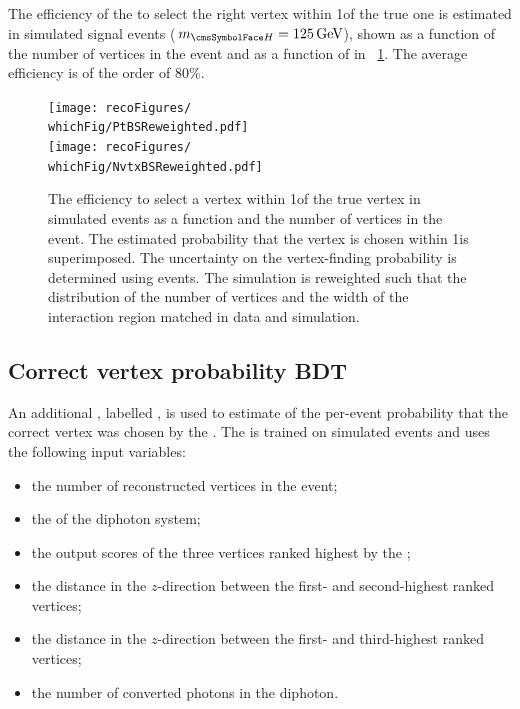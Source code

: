 The efficiency of the \VtxIdBdt to select the right vertex within 1\cm of the true one is estimated in simulated signal events ($\mH=125\GeV$), shown as a function of the number of vertices in the event and as a function of \pT in \Fig~\ref{fig:reco:vtxidbdt_eff}. The average efficiency is of the order of 80\%. 

\begin{figure}[hpt]
\centering
\texttt{[image: recoFigures/\\whichFig/PtBSReweighted.pdf]}\\
\texttt{[image: recoFigures/\\whichFig/NvtxBSReweighted.pdf]}
\caption{The efficiency to select a vertex within 1\cm of the true vertex in simulated \Hgg events as a function \pT and the number of vertices in the event. The estimated probability that the vertex is chosen within 1\cm is superimposed. The uncertainty on the vertex-finding probability is determined using \Zmumu events. The simulation is reweighted such that the distribution of the number of vertices and the width of the interaction region matched in data and simulation. }
\label{fig:reco:vtxidbdt_eff}
\end{figure}

\subsection{Correct vertex probability BDT}
\label{reco:sec:vtx_prob}

An additional \BDT, labelled \VtxProbBdt, is used to estimate of the per-event probability that the correct vertex was chosen by the \VtxProbBdt. The \VtxProbBdt is trained on simulated \Hgg events and uses the following input variables: 

\begin{itemize}
\item the number of reconstructed vertices in the event;
\item the \pT of the diphoton system;
\item the output scores of the three vertices ranked highest by the \VtxIdBdt;
\item the distance in the $z$-direction between the first- and second-highest ranked vertices;
\item the distance in the $z$-direction between the first- and third-highest ranked vertices;
\item the number of converted photons in the diphoton. 
\end{itemize}

